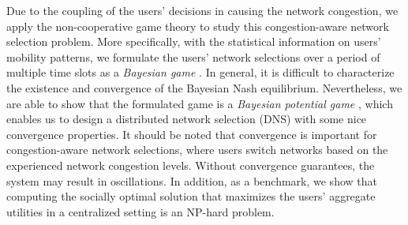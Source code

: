 \documentclass[journal]{IEEEtran}
\begin{document}
  Due to the coupling of the users' decisions in causing the network congestion, we apply the non-cooperative game theory to study this congestion-aware network selection problem. More specifically, with the statistical information on users' mobility patterns, we formulate the users' network selections over a period of multiple time slots as a \emph{Bayesian game} \cite{shoham_ma08}. In general, it is difficult to characterize the existence and convergence of the Bayesian Nash equilibrium.
	Nevertheless, we are able to show that the formulated game is a \emph{Bayesian potential game} \cite{facchini_cm97}, which enables us to design a distributed network selection (DNS) with some nice convergence properties. %
  It should be noted that convergence is important for congestion-aware network selections, where users switch networks based on the experienced network congestion levels. Without convergence guarantees, the system may result in oscillations.
	In addition, as a benchmark, we show that computing the socially optimal solution that maximizes the users' aggregate utilities in a centralized setting is an NP-hard problem.

\end{document}
